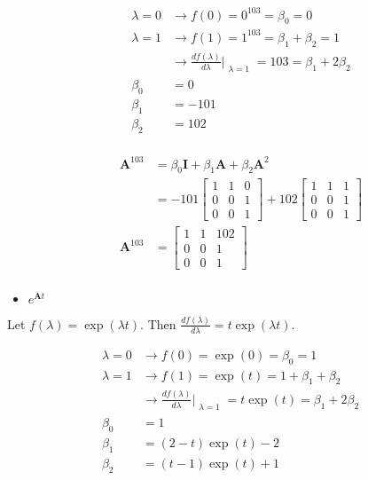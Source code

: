 \begin{itemize}
 \begin{align*}
  \lambda = 0 & \rightarrow f(0) = 0^{103} = \beta_0 = 0\\
  \lambda = 1 & \rightarrow f(1) = 1^{103} = \beta_1 + \beta_2 = 1\\
  &\rightarrow \frac{d f(\lambda)}{d\lambda}\Bigr|_{\substack{\lambda=1}} = 103 = \beta_1 + 2 \beta_2\\
  \beta_0 &= 0\\
  \beta_1 &= -101\\
  \beta_2 &= 102\\
\end{align*}

\begin{align*}
    \mathbf{A}^{103} &= \beta_0 \mathbf{I}+  \beta_1 \mathbf{A} + \beta_2 \mathbf{A}^2\\
    &= -101 \begin{bmatrix}
           1& 1& 0\\
           0 & 0 & 1\\
           0 & 0 &1
          \end{bmatrix}
+
102       \begin{bmatrix}
            1 & 1&1\\
            0 &0&1\\
            0 &0 &1
        \end{bmatrix}\\
         \mathbf{A}^{103} &=  \begin{bmatrix}
            1 & 1&102\\
            0 &0&1\\
            0 &0 &1
        \end{bmatrix}\\
 \end{align*}

 \item $e^{\mathbf{A}t}$
\end{itemize}

  Let $f(\lambda) = \exp(\lambda t)$.
 Then $\frac{d f(\lambda)}{d\lambda} = t \exp(\lambda t)$.

 \begin{align*}
  \lambda = 0 & \rightarrow f(0) = \exp(0) = \beta_0 = 1\\
  \lambda = 1 & \rightarrow f(1) = \exp(t) = 1 + \beta_1 + \beta_2 \\
  &\rightarrow \frac{d f(\lambda)}{d\lambda}\Bigr|_{\substack{\lambda=1}} = t \exp(t) = \beta_1 + 2 \beta_2\\
  \beta_0 &= 1\\
  \beta_1 &= (2-t) \exp(t) -2\\
  \beta_2 &= (t-1) \exp(t) +1\\
\end{align*}

